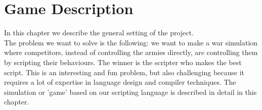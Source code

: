 \chapter{Game Description}
In this chapter we describe the general setting of the project. \\
The problem we want to solve is the following: we want to make a war simulation where competitors, 
instead of controlling the armies directly, are controlling them by scripting their behaviours. The winner is the scripter who makes the best script. 
This is an interesting and fun problem, but also challenging because it requires a lot of expertise in language design and compiler techniques.
The simulation or 'game' based on our scripting language is described in detail in this chapter.